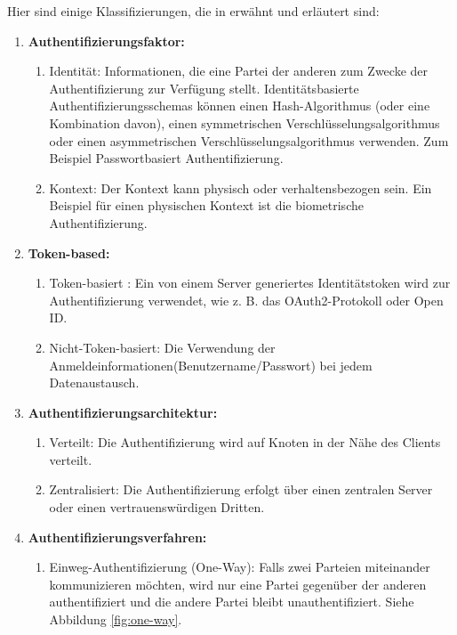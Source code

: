  Hier sind einige Klassifizierungen, die in \cite{khatoun2022cybersecurity}\cite{el2019survey} erwähnt und erläutert sind:

\begin{enumerate}
        \item \textbf{Authentifizierungsfaktor:}
        \begin{enumerate}
            \item Identität: Informationen, die eine Partei der anderen zum Zwecke der Authentifizierung zur Verfügung stellt. Identitätsbasierte Authentifizierungsschemas können einen Hash-Algorithmus (oder eine Kombination davon), einen symmetrischen Verschlüsselungsalgorithmus oder einen asymmetrischen Verschlüsselungsalgorithmus verwenden. Zum Beispiel Passwortbasiert Authentifizierung.
            \item Kontext: Der Kontext kann physisch oder verhaltensbezogen sein. Ein Beispiel für einen physischen Kontext ist die biometrische Authentifizierung. 
        \end{enumerate}


    \item \textbf{Token-based:}
    \begin{enumerate}
        \item Token-basiert
        : Ein von einem Server generiertes Identitätstoken wird zur Authentifizierung verwendet, wie z. B. das OAuth2-Protokoll oder Open ID.
        \item Nicht-Token-basiert: Die Verwendung der Anmeldeinformationen(Benutzername/Passwort) bei jedem Datenaustausch.
    \end{enumerate}

    \item \textbf{Authentifizierungsarchitektur:}
    \begin{enumerate}
        \item Verteilt: Die Authentifizierung wird auf Knoten in der Nähe des Clients verteilt.
        \item Zentralisiert: Die Authentifizierung erfolgt über einen zentralen Server oder einen vertrauenswürdigen Dritten.
    \end{enumerate}

    \item \textbf{Authentifizierungsverfahren:}
    \begin{enumerate}
        \item Einweg-Authentifizierung (One-Way): Falls zwei Parteien miteinander kommunizieren möchten, wird nur eine Partei gegenüber der anderen authentifiziert und die andere Partei bleibt unauthentifiziert. Siehe Abbildung \ref{fig:one-way}.


\end{enumerate}
\end{enumerate}
